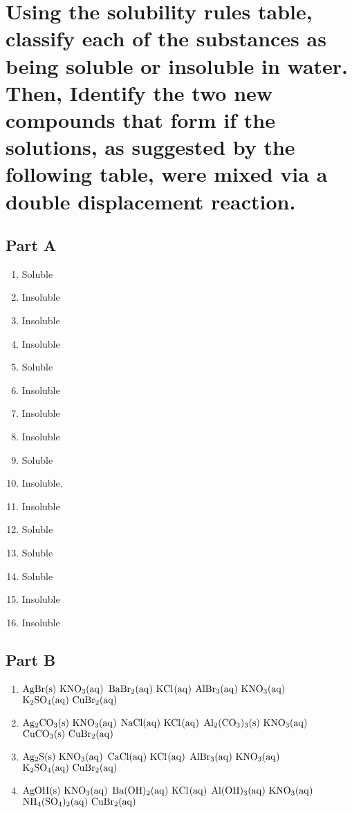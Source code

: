 \documentclass{scrartcl}
\begin{document}
\section{Using the solubility rules table, classify each of the substances as being soluble or insoluble in water. Then, Identify the two new compounds that form if the solutions, as suggested by the following table, were mixed via a double displacement reaction.}
\label{sec:org5a5d2db}

\subsection{Part A}
\label{sec:orgfb83031}
\begin{enumerate}
\item Soluble
\item Insoluble
\item Insoluble
\item Insoluble
\item Soluble
\item Insoluble
\item Insoluble
\item Insoluble
\item Soluble
\item Insoluble.
\item Insoluble
\item Soluble
\item Soluble
\item Soluble
\item Insoluble
\item Insoluble
\end{enumerate}

\subsection{Part B}
\label{sec:org3ff7f14}
\begin{enumerate}
\item \(\ce{AgBr(s)\ KNO3(aq)}\)
\(\ce{BaBr2(aq)\ KCl(aq)}\)
\(\ce{AlBr3(aq)\ KNO3(aq)}\)
\(\ce{K2SO4(aq)\ CuBr2(aq)}\)

\item \(\ce{Ag2CO3(s)\ KNO3(aq)}\)
\(\ce{NaCl(aq)\ KCl(aq)}\)
\(\ce{Al2(CO3)3(s)\ KNO3(aq)}\)
\(\ce{CuCO3(s)\ CuBr2(aq)}\)

\item \(\ce{Ag2S(s)\ KNO3(aq)}\)
\(\ce{CaCl(aq)\ KCl(aq)}\)
\(\ce{AlBr3(aq)\ KNO3(aq)}\)
\(\ce{K2SO4(aq)\ CuBr2(aq)}\)

\item \(\ce{AgOH(s)\ KNO3(aq)}\)
\(\ce{Ba(OH)2(aq)\ KCl(aq)}\)
\(\ce{Al(OH)3(aq)\ KNO3(aq)}\)
\(\ce{NH4(SO4)2(aq)\ CuBr2(aq)}\)
\end{enumerate}
\end{document}
